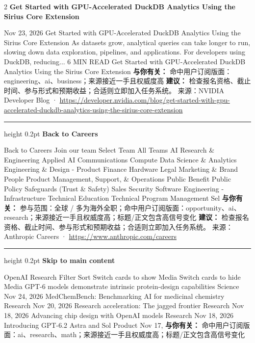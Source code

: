 \documentclass[10.5pt]{ctexart}
\begin{document}
\begin{multicols}{2}
{\large\bfseries Get Started with GPU-Accelerated DuckDB Analytics Using the Sirius Core Extension}\par
Nov 23, 2026 Get Started with GPU-Accelerated DuckDB Analytics Using the Sirius Core Extension As datasets grow, analytical queries can take longer to run, slowing down data exploration, pipelines, and applications. For developers using DuckDB, reducing... 6 MIN READ Get Started with GPU-Accelerated DuckDB Analytics Using the Sirius Core Extension
\textbf{与你有关：} 命中用户订阅版面：engineering、ai、business；来源接近一手且权威度高
\textbf{建议：} 检查报名资格、截止时间、参与形式和预期收益；合适则立即加入任务系统。
{\footnotesize\color{ormuted} 来源：NVIDIA Developer Blog · \url{https://developer.nvidia.com/blog/get-started-with-gpu-accelerated-duckdb-analytics-using-the-sirius-core-extension}}
\vspace{2mm}
\hrule height 0.2pt
\vspace{2mm}
{\large\bfseries Back to Careers}\par
Back to Careers Join our team Select Team All Teams AI Research \& Engineering Applied AI Communications Compute Data Science \& Analytics Engineering \& Design - Product Finance Hardware Legal Marketing \& Brand People Product Management, Support, \& Operations Public Benefit Public Policy Safeguards (Trust \& Safety) Sales Security Software Engineering - Infrastructure Technical Education Technical Program Management Sel
\textbf{与你有关：} 参与范围：全球 / 多为海外全职；命中用户订阅版面：opportunity、ai、research；来源接近一手且权威度高；标题/正文包含高信号变化
\textbf{建议：} 检查报名资格、截止时间、参与形式和预期收益；合适则立即加入任务系统。
{\footnotesize\color{ormuted} 来源：Anthropic Careers · \url{https://www.anthropic.com/careers}}
\vspace{2mm}
\hrule height 0.2pt
\vspace{2mm}
{\large\bfseries Skip to main content}\par
OpenAI Research Filter Sort Switch cards to show Media Switch cards to hide Media GPT-6 models demonstrate intrinsic protein-design capabilities Science Nov 24, 2026 MedChemBench: Benchmarking AI for medicinal chemistry Research Nov 20, 2026 Research acceleration: The jagged frontier Research Nov 18, 2026 Advancing chip design with OpenAI models Research Nov 18, 2026 Introducing GPT-6.2 Astra and Sol Product Nov 17, 
\textbf{与你有关：} 命中用户订阅版面：ai、research、math；来源接近一手且权威度高；标题/正文包含高信号变化

\end{multicols}
\end{document}

